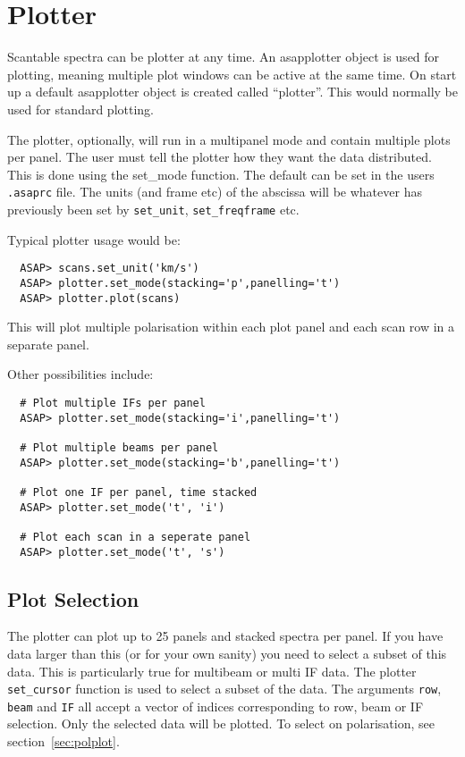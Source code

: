 \documentclass[11pt]{article}
\newcommand{\cmd}[1]{{\tt #1}}
\begin{document}
\section{Plotter}

Scantable spectra can be plotter at any time. An asapplotter object is
used for plotting, meaning multiple plot windows can be active at the
same time. On start up a default asapplotter object is created called
``plotter''. This would normally be used for standard plotting.

The plotter, optionally, will run in a multipanel mode and contain
multiple plots per panel. The user must tell the plotter how they want
the data distributed. This is done using the set\_mode function. The
default can be set in the users {\tt .asaprc} file. The units (and frame
etc) of the abscissa will be whatever has previously been set by
\cmd{set\_unit}, \cmd{set\_freqframe} etc.

Typical plotter usage would be:

\begin{verbatim}
  ASAP> scans.set_unit('km/s')
  ASAP> plotter.set_mode(stacking='p',panelling='t')
  ASAP> plotter.plot(scans)
\end{verbatim}

This will plot multiple polarisation within each plot panel and each
scan row in a separate panel.

Other possibilities include:

\begin{verbatim}
  # Plot multiple IFs per panel
  ASAP> plotter.set_mode(stacking='i',panelling='t')

  # Plot multiple beams per panel
  ASAP> plotter.set_mode(stacking='b',panelling='t')

  # Plot one IF per panel, time stacked
  ASAP> plotter.set_mode('t', 'i')

  # Plot each scan in a seperate panel
  ASAP> plotter.set_mode('t', 's')

\end{verbatim}

\subsection{Plot Selection}
\label{sec:plotter_cursor}

The plotter can plot up to 25 panels and stacked spectra per
panel. If you have data larger than this (or for your own sanity) you
need to select a subset of this data. This is particularly true for
multibeam or multi IF data. The plotter \cmd{set\_cursor} function is
used to select a subset of the data. The arguments \cmd{row},
\cmd{beam} and \cmd{IF} all accept a vector of indices corresponding
to row, beam or IF selection. Only the selected data will be plotted.
To select on polarisation, see section~\ref{sec:polplot}.
\end{document}
